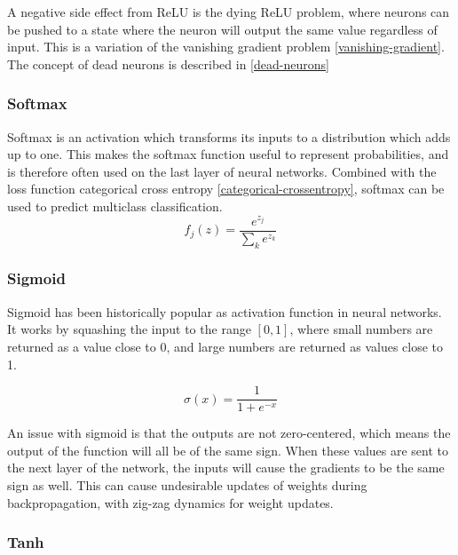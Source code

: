 A negative side effect from ReLU is the dying ReLU problem, where neurons can be pushed to a state where the neuron will output the same value regardless of input. This is a variation of the vanishing gradient problem \ref{vanishing-gradient}. The concept of dead neurons is described in \ref{dead-neurons}\cite{zeiler_rectified_2013} %

\subsubsection{Softmax}

Softmax is an activation which transforms its inputs to a distribution which adds up to one. This makes the softmax function useful to represent probabilities, and is therefore often used on the last layer of neural networks. Combined with the loss function categorical cross entropy \ref{categorical-crossentropy}, softmax can be used to predict multiclass classification.\cite{_cs231n_????-1}
\begin{equation} \label{eqn:softmax}
    f_j(z) = \frac{e^{z_j}}{\sum_k e^{z_k}}
\end{equation}



\subsubsection{Sigmoid}

Sigmoid has been historically popular as activation function in neural networks. It works by squashing the input to the range $[0, 1]$, where small numbers are returned as a value close to 0, and large numbers are returned as values close to 1. 

\begin{equation} \label{eqn:sigmoid}
    \sigma(x) = \frac{1}{1 + e^{-x}}
\end{equation}

An issue with sigmoid is that the outputs are not zero-centered, which means the output of the function will all be of the same sign. When these values are sent to the next layer of the network, the inputs will cause the gradients to be the same sign as well. This can cause undesirable updates of weights during backpropagation, with zig-zag dynamics for weight updates. \cite{_neural_2018}

\subsubsection{Tanh}

